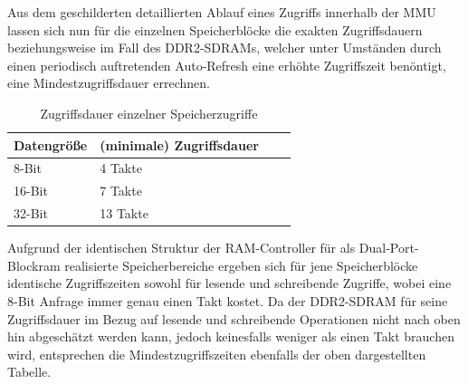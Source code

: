 
Aus dem geschilderten detaillierten Ablauf eines Zugriffs innerhalb der MMU lassen sich nun f\"ur die einzelnen Speicherbl\"ocke die exakten Zugriffsdauern beziehungsweise im Fall des DDR2-SDRAMs, welcher unter Umst\"anden durch einen periodisch auftretenden Auto-Refresh eine erh\"ohte Zugriffszeit ben\"ontigt, eine Mindestzugriffsdauer errechnen.

\begin{table}[H]
\begin{center}
	\begin{tabular}{| l | l | l | l |}
		\hline
		Datengr\"o\ss{}e & (minimale) Zugriffsdauer \\ \hline
		8-Bit & 4 Takte \\ \hline 
		16-Bit & 7 Takte \\ \hline
		32-Bit & 13 Takte \\ \hline
	\end{tabular}
\end{center}
\caption{Zugriffsdauer einzelner Speicherzugriffe}
\end{table}

Aufgrund der identischen Struktur der RAM-Controller f\"ur als Dual-Port-Blockram realisierte Speicherbereiche ergeben sich f\"ur jene Speicherbl\"ocke identische Zugriffszeiten sowohl f\"ur lesende und schreibende Zugriffe, wobei eine 8-Bit Anfrage immer genau einen Takt kostet. Da der DDR2-SDRAM f\"ur seine Zugriffsdauer im Bezug auf lesende und schreibende Operationen nicht nach oben hin abgesch\"atzt werden kann, jedoch keinesfalls weniger als einen Takt brauchen wird, entsprechen die Mindestzugriffszeiten ebenfalls der oben dargestellten Tabelle.

\newpage

